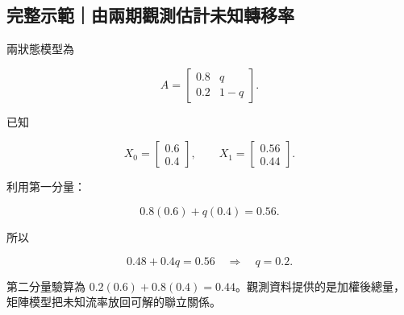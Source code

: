 \documentclass[11pt,a4paper]{article}
\begin{document}
\begin{HandoutWorkedExample}

\subsection{完整示範｜由兩期觀測估計未知轉移率}\label{ux5b8cux6574ux793aux7bc4ux7531ux5169ux671fux89c0ux6e2cux4f30ux8a08ux672aux77e5ux8f49ux79fbux7387}

兩狀態模型為

\[
A=
\begin{bmatrix}
0.8&q\\
0.2&1-q
\end{bmatrix}.
\]

已知

\[
X_0=\begin{bmatrix}0.6\\0.4\end{bmatrix},
\qquad
X_1=\begin{bmatrix}0.56\\0.44\end{bmatrix}.
\]

利用第一分量：

\[
0.8(0.6)+q(0.4)=0.56.
\]

所以

\[
0.48+0.4q=0.56
\quad\Longrightarrow\quad
\boxed{q=0.2}.
\]

第二分量驗算為 \(0.2(0.6)+0.8(0.4)=0.44\)。觀測資料提供的是加權後總量，矩陣模型把未知流率放回可解的聯立關係。

\end{HandoutWorkedExample}
\end{document}
